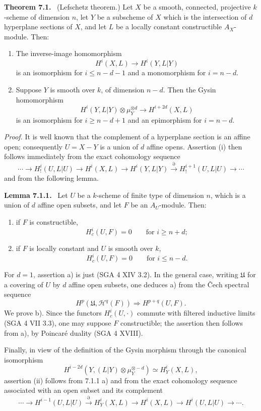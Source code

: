 \documentclass[11pt]{article}
\newenvironment{statement}[1]{\par\medskip\noindent\textbf{#1.}\ }{\par\medskip}
\begin{document}
\begin{statement}{Theorem 7.1}
(Lefschetz theorem.) Let $X$ be a smooth, connected, projective $k$-scheme of dimension $n$, let $Y$ be a subscheme of $X$ which is the intersection of $d$ hyperplane sections of $X$, and let $L$ be a locally constant constructible $A_X$-module. Then:
\begin{enumerate}[label=(\roman*)]
\item The inverse-image homomorphism
\[
H^i(X,L)\to H^i(Y,L|Y)
\]
is an isomorphism for $i\le n-d-1$ and a monomorphism for $i=n-d$.
\item Suppose $Y$ is smooth over $k$, of dimension $n-d$. Then the Gysin homomorphism
\[
H^i(Y,L|Y)\otimes\mu_Y^{\otimes d}\to H^{i+2d}(X,L)
\]
is an isomorphism for $i\ge n-d+1$ and an epimorphism for $i=n-d$.
\end{enumerate}
\end{statement}

\emph{Proof.} It is well known that the complement of a hyperplane section is an affine open; consequently $U=X-Y$ is a union of $d$ affine opens. Assertion (i) then follows immediately from the exact cohomology sequence
\[
\cdots\to H_!^i(U,L|U)\to H^i(X,L)\to H^i(Y,L|Y)
\xrightarrow{\partial} H_!^{i+1}(U,L|U)\to\cdots
\]
and from the following lemma.

\begin{statement}{Lemma 7.1.1}
Let $U$ be a $k$-scheme of finite type of dimension $n$, which is a union of $d$ affine open subsets, and let $F$ be an $A_U$-module. Then:
\begin{enumerate}[label=\alph*)]
\item if $F$ is constructible,
\[
H^i_c(U,F)=0\qquad\text{for }i\ge n+d;
\]
\item if $F$ is locally constant and $U$ is smooth over $k$,
\[
H^i_c(U,F)=0\qquad\text{for }i\le n-d.
\]
\end{enumerate}
\end{statement}

For $d=1$, assertion a) is just (SGA 4 XIV 3.2). In the general case, writing $\mathfrak U$ for a covering of $U$ by $d$ affine open subsets, one deduces a) from the Čech spectral sequence
\[
H^p(\mathfrak U,\mathcal H^q(F))\Rightarrow H^{p+q}(U,F).
\]
We prove b). Since the functors $H_c^i(U,\cdot)$ commute with filtered inductive limits (SGA 4 VII 3.3), one may suppose $F$ constructible; the assertion then follows from a), by Poincaré duality (SGA 4 XVIII).

Finally, in view of the definition of the Gysin morphism through the canonical isomorphism
\[
H^{i-2d}(Y,(L|Y)\otimes\mu_Y^{\otimes -d})\simeq H^i_Y(X,L),
\tag{7.1.2}
\]
assertion (ii) follows from 7.1.1 a) and from the exact cohomology sequence associated with an open subset and its complement
\[
\cdots\to H^{i-1}(U,L|U)\xrightarrow{\partial}H^i_Y(X,L)\to H^i(X,L)\to H^i(U,L|U)\to\cdots .
\]
\end{document}
